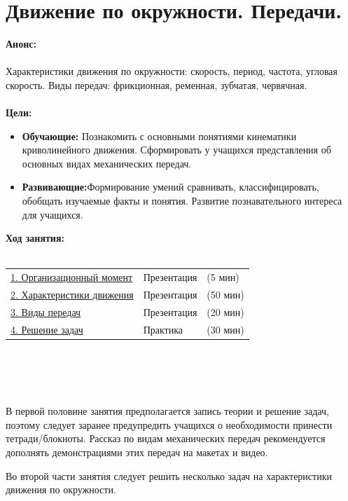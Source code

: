 \chapter{Движение по окружности. Передачи.}
{\bfseries Анонс:}\\\\
Характеристики движения по окружности: скорость, период, частота, угловая скорость. Виды передач: фрикционная, ременная, зубчатая, червячная.\\\\
{\bfseries Цели:}
\begin{itemize}
	\item{}{\bfseries Обучающие:} Познакомить с основными понятиями кинематики криволинейного движения. Сформировать у учащихся представления об основных видах механических передач.
	\item{}{\bfseries Развивающие:}Формирование умений сравнивать, классифицировать, обобщать изучаемые факты и понятия. Развитие познавательного интереса для учащихся.\\
\end{itemize}	
{\bfseries Ход занятия:}\\\\
\begin{tabular}{lll}
	\hyperlink{lesson5x1}{1. Организационный момент} & Презентация & (5 мин)\\
	\hyperlink{lesson5x2}{2. Характеристики движения} & Презентация & (50 мин) \\
	\hyperlink{lesson5x3}{3. Виды передач} & Презентация & (20 мин) \\
	\hyperlink{lesson5x4}{4. Решение задач} & Практика & (30 мин)\\
\end{tabular}\\\\

{\hypertarget{lesson5x1}{}}\\\\

В первой половине занятия предполагается запись теории и решение задач, поэтому следует заранее предупредить учащихся о необходимости принести тетради/блокноты. Рассказ по видам механических передач рекомендуется дополнять демонстрациями этих передач на макетах и видео.

Во второй части занятия следует решить несколько задач на характеристики движения по окружности.\\\\

